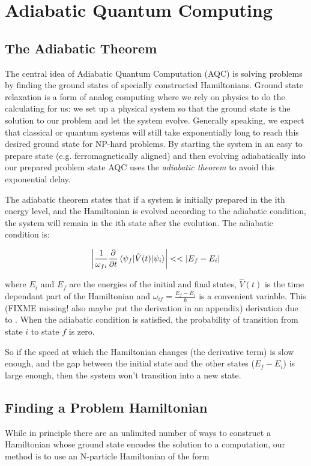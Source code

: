\chapter{Adiabatic Quantum Computing}
\label{chap:aqc}

\section{The Adiabatic Theorem}

The central idea of Adiabatic Quantum Computation (AQC) is solving problems by finding the ground states of specially constructed Hamiltonians.  Ground state relaxation is a form of analog computing where we rely on physics to do the calculating for us: we set up a physical system so that the ground state is the solution to our problem and let the system evolve.  Generally speaking, we expect that classical or quantum systems will still take exponentially long to reach this desired ground state for NP-hard problems.\cite{aaronson}
By starting the system in an easy to prepare state (e.g. ferromagnetically aligned) and then evolving adiabatically into our prepared problem state AQC uses the \emph{adiabatic theorem} to avoid this exponential delay.

The adiabatic theorem states that if a system is initially prepared in the ith energy level, and the Hamiltonian is evolved according to the adiabatic condition, the system will remain in the ith state after the evolution.  The adiabatic condition is:

\begin{displaymath}
	\left | \frac{1}{\omega_{fi}}\frac{\partial}{\partial t} \mathinner{\langle{\psi_f | \hat{V}(t) | \psi_i}\rangle} \right | << |E_f - E_i|
\end{displaymath}

where $E_i$ and $E_f$ are the energies of the initial and final states, $\hat{V}(t)$ is the time dependant part of the Hamiltonian and $\omega_{if} = \frac{E_f - E_i}{\hbar}$ is a convenient variable.  This (FIXME missing! also maybe put the derivation in an appendix) derivation due to \cite{zettili}.  When the adiabatic condition is satisfied, the probability of transition from state $i$ to state $f$ is zero.

So if the speed at which the Hamiltonian changes (the derivative term) is slow enough, and the gap between the initial state and the other states ($E_f - E_i$) is large enough, then the system won't transition into a new state.  

\section{Finding a Problem Hamiltonian}
While in principle there are an unlimited number of ways to construct a Hamiltonian whose ground state encodes the solution to a computation, our method is to use an N-particle Hamiltonian of the form

